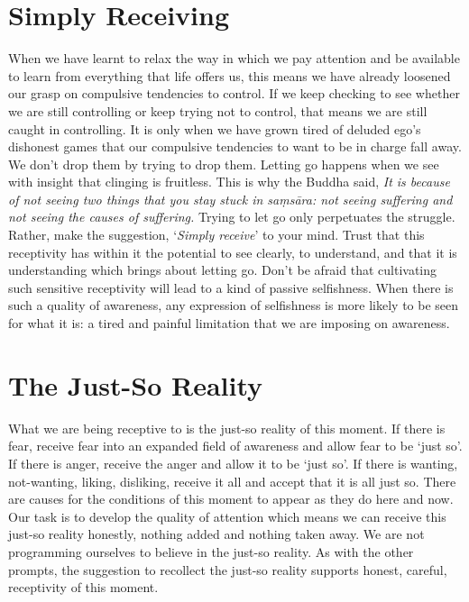 \section{Simply Receiving}

When we have learnt to relax the way in which we pay attention and be
available to learn from everything that life offers us, this means we
have already loosened our grasp on compulsive tendencies to control. If
we keep checking to see whether we are still controlling or keep trying
not to control, that means we are still caught in controlling. It is
only when we have grown tired of deluded ego’s dishonest games that our
compulsive tendencies to want to be in charge fall away. We don’t drop
them by trying to drop them. Letting go happens when we see with insight
that clinging is fruitless. This is why the Buddha said, \emph{It is because
of not seeing two things that you stay stuck in saṃsāra: not seeing
suffering and not seeing the causes of suffering.} Trying to let go only
perpetuates the struggle. Rather, make the suggestion, ‘\emph{Simply
receive}’ to your mind. Trust that this receptivity has within it
the potential to see clearly, to understand, and that it is
understanding which brings about letting go. Don’t be afraid that
cultivating such sensitive receptivity will lead to a kind of passive
selfishness. When there is such a quality of awareness, any expression
of selfishness is more likely to be seen for what it is: a tired and
painful limitation that we are imposing on awareness.

\section{The Just-So Reality}

What we are being receptive to is the just-so reality of this moment.
If there is fear, receive fear into an expanded field of awareness and
allow fear to be ‘just so’. If there is anger, receive the anger and
allow it to be ‘just so’. If there is wanting, not-wanting, liking,
disliking, receive it all and accept that it is all just so. There are
causes for the conditions of this moment to appear as they do here and
now. Our task is to develop the quality of attention which means we can
receive this just-so reality honestly, nothing added and nothing taken
away. We are not programming ourselves to believe in the just-so
reality. As with the other prompts, the suggestion to recollect the
just-so reality supports honest, careful, receptivity of this moment.


